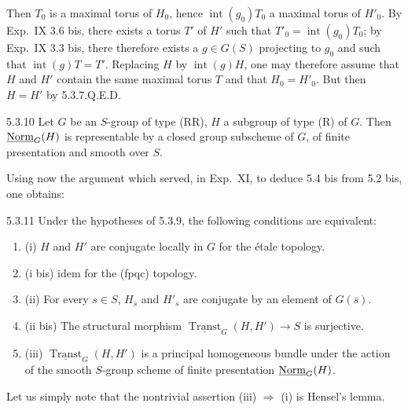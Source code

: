 Then $T_0$ is a maximal torus of $H_0$, hence $\operatorname{int}(g_0)T_0$ a maximal torus of $H'_0$. By Exp.~IX 3.6 bis, there exists a torus $T'$ of $H'$ such that $T'_0=\operatorname{int}(g_0)T_0$; by Exp.~IX 3.3 bis, there therefore exists a $g\in G(S)$ projecting to $g_0$ and such that $\operatorname{int}(g)T=T'$. Replacing $H$ by $\operatorname{int}(g)H$, one may therefore assume that $H$ and $H'$ contain the same maximal torus $T$ and that $H_0=H'_0$. But then $H=H'$ by 5.3.7.\hfill Q.E.D.
\begin{corollary}{5.3.10}\label{XXII.5.3.10}
Let $G$ be an $S$-group of type (RR), $H$ a subgroup of type (R) of $G$. Then $\underline{\mathrm{Norm}}_G(H)$ is representable by a closed group subscheme of $G$, of finite presentation and smooth over $S$.
\end{corollary}
Using now the argument which served, in Exp.~XI, to deduce 5.4 bis from 5.2 bis, one obtains:
\begin{corollary}{5.3.11}\label{XXII.5.3.11}
Under the hypotheses of 5.3.9, the following conditions are equivalent:
\begin{enumerate}[label={}]
\item (i) $H$ and $H'$ are conjugate locally in $G$ for the \'etale topology.
\item (i bis) idem for the (fpqc) topology.
\item (ii) For every $s\in S$, $H_{\overline s}$ and $H'_{\overline s}$ are conjugate by an element of $G(\overline s)$.
\item (ii bis) The structural morphism $\underline{\operatorname{Transt}}_G(H,H')\to S$ is surjective.
\item (iii) $\underline{\operatorname{Transt}}_G(H,H')$ is a principal homogeneous bundle under the action of the smooth $S$-group scheme of finite presentation $\underline{\mathrm{Norm}}_G(H)$.
\end{enumerate}
\end{corollary}
Let us simply note that the nontrivial assertion (iii) $\Rightarrow$ (i) is Hensel's lemma.

